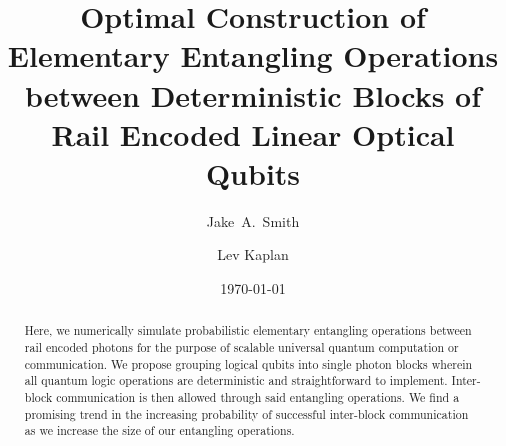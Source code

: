 \documentclass[aps,pra,twocolumn,showpacs,superscriptaddress,floatfix,10pt]{revtex4}
\begin{document}
\newcommand{\beq}{\begin{equation}}
\newcommand{\eeq}{\end{equation}}
\newcommand{\ben}{\begin{eqnarray}}
\newcommand{\een}{\end{eqnarray}}
\newcommand{\bea}{\begin{array}}
\newcommand{\eea}{\end{array}}
\newcommand{\om}{(\omega )}
\newcommand{\bef}{\begin{figure}}
\newcommand{\eef}{\end{figure}}
\newcommand{\leg}[1]{\caption{\protect\rm{\protect\footnotesize{#1}}}}
\newcommand{\ew}[1]{\langle{#1}\rangle}
\newcommand{\be}[1]{\mid\!{#1}\!\mid}
\newcommand{\no}{\nonumber}
\newcommand{\etal}{{\em et~al }}
\newcommand{\geff}{g_{\mbox{\it{\scriptsize{eff}}}}}
\newcommand{\da}[1]{{#1}^\dagger}
\newcommand{\cf}{{\it cf.\/}\ }
\newcommand{\ie}{{\it i.e.\/}\ }   

\newcommand{\spazio}{\vspace{0.3cm}}%
\newcommand{\de}[1]{\frac{\partial}{\partial{#1}}}
\newcommand{\U}{\tilde{U}}
\newcommand{\V}{\tilde{V}}


\title{Optimal Construction of Elementary Entangling Operations between Deterministic Blocks of Rail Encoded Linear Optical Qubits}

\author{Jake~A.~Smith}

\author{Lev Kaplan}

 \begin{abstract}
Here, we numerically simulate probabilistic elementary entangling operations between rail encoded photons for the purpose of scalable universal quantum computation or communication. We propose grouping logical qubits into single photon blocks wherein all quantum logic operations are deterministic and straightforward to implement. Inter-block communication is then allowed through said entangling operations. We find a promising trend in the increasing probability of successful inter-block communication as we increase the size of our entangling operations.
\end{abstract}                                                               
\date{\today}
\pacs{***}
\maketitle
\end{document}
